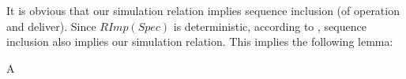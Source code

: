 It is obvious that our simulation relation implies sequence inclusion (of operation and deliver). Since $RImp(Spec)$ is deterministic, according to \cite{Abadi:1991,Lynch:1995}, sequence inclusion also implies our simulation relation. This implies the following lemma: 

\begin{lemma}
\label{lemma:equivalence of our simulation relation and sequence inclusion}
A 
\end{lemma}




